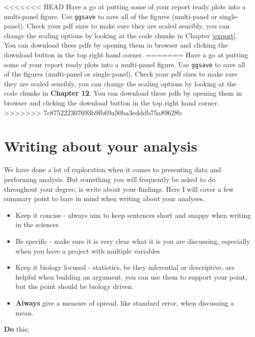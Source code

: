 \documentclass[
]{book}
\providecommand{\tightlist}{%
  \setlength{\itemsep}{0pt}\setlength{\parskip}{0pt}}
\begin{document}
\textless\textless\textless\textless\textless\textless\textless{} HEAD
Have a go at putting some of your report ready plots into a multi-panel figure. Use \texttt{ggsave} to save all of the figures (multi-panel or single-panel). Check your pdf sizes to make sure they are scaled sensibly, you can change the scaling options by looking at the code chunks in Chapter \ref{export}. You can download these pdfs by opening them in browser and clicking the download button in the top right hand corner.
=======
Have a go at putting some of your report ready plots into a multi-panel figure. Use \texttt{ggsave} to save all of the figures (multi-panel or single-panel). Check your pdf sizes to make sure they are scaled sensibly, you can change the scaling options by looking at the code chunks in \textbf{Chapter 12}. You can download these pdfs by opening them in browser and clicking the download button in the top right hand corner.
\textgreater\textgreater\textgreater\textgreater\textgreater\textgreater\textgreater{} 7c875222307693b9fb69a50ba3edddb75a89628b

\hypertarget{analysis-writing}{%
\section{Writing about your analysis}\label{analysis-writing}}

We have done a lot of exploration when it comes to presenting data and performing analysis. But something you will frequently be asked to do throughout your degree, is write about your findings. Here I will cover a few summary point to bare in mind when writing about your analyses.

\begin{itemize}
\tightlist
\item
  Keep it concise - always aim to keep sentences short and snappy when writing in the sciences
\item
  Be specific - make sure it is very clear what it is you are discussing, especially when you have a project with multiple variables
\item
  Keep it biology focused - statistics, be they inferential or descriptive, are helpful when building an argument, you can use them to support your point, but the point should be biology driven.
\item
  \textbf{Always} give a measure of spread, like standard error, when discussing a mean.
\end{itemize}

\textbf{Do} this;
\end{document}
